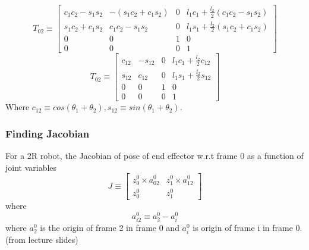 \documentclass[12pt]{article}
\newcommand{\fromlectures}{{\\ \color{blue} \hspace*{\fill}(from lecture slides)} \\}
\begin{document}
\[
  T_{02} \equiv
  \begin{bmatrix} c_1c_2 - s_1s_2 & -(s_1c_2 + c_1s_2) & 0 & l_1c_1 + \frac{l_2}{2}(c_1c_2 - s_1s_2) \\ s_1c_2 + c_1s_2 & c_1c_2 - s_1s_2 & 0 & l_1s_1 + \frac{l_2}{2}(s_1c_2 + c_1s_2) \\ 0 & 0 & 1 & 0 \\ 0 & 0 & 0 & 1 \end{bmatrix}
\]
\[
  T_{02} \equiv
  \begin{bmatrix} c_{12} & -s_{12} & 0 & l_1c_1 + \frac{l_2}{2}c_{12} \\ s_{12} & c_{12} & 0 & l_1s_1 + \frac{l_2}{2}s_{12} \\ 0 & 0 & 1 & 0 \\ 0 & 0 & 0 & 1 \end{bmatrix}
\]
Where $c_{12} \equiv cos(\theta_1 + \theta_2), s_{12} \equiv sin(\theta_1 + \theta_2)$.

\subsubsection*{Finding Jacobian}
For a 2R robot, the Jacobian of pose of end effector w.r.t frame 0 as a function of joint variables
\[
  J \equiv
  \begin{bmatrix} z_0^0 \times a_{02}^0 & z_1^0 \times a_{12}^0\\ z_0^0 & z_1^0 \end{bmatrix}
\]
where
\[
  a_{i2}^{0} \equiv a_{2}^{0} - a_{i}^{0}
\]
where $a_2^0$ is the origin of frame 2 in frame 0 and $a_i^0$ is origin of frame i in frame 0.
\fromlectures
\end{document}
